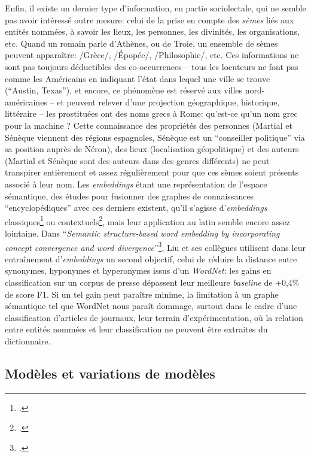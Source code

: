 Enfin, il existe un dernier type d'information, en partie sociolectale, qui ne semble pas avoir intéressé outre mesure: celui de la prise en compte des \textit{sèmes} liés aux entités nommées, à savoir les lieux, les personnes, les divinités, les organisations, etc. Quand un romain parle d'Athènes, ou de Troie, un ensemble de sèmes peuvent apparaître: /Grèce/, /Épopée/, /Philosophie/, etc. Ces informations ne sont pas toujours déductibles des co-occurrences -- tous les locuteurs ne font pas comme les Américains en indiquant l'état dans lequel une ville se trouve (\enquote{Austin, Texas}), et encore, ce phénomène est réservé aux villes nord-américaines -- et peuvent relever d'une projection géographique, historique, littéraire -- les prostituées ont des noms grecs à Rome: qu'est-ce qu'un nom grec pour la machine ? Cette connaissance des propriétés des personnes (Martial et Sénèque viennent des régions espagnoles, Sénèque est un \enquote{conseiller politique} via sa position auprès de Néron), des lieux (localisation géopolitique) et des auteurs (Martial et Sénèque sont des auteurs dans des genres différents) ne peut transpirer entièrement et assez régulièrement pour que ces sèmes soient présents associé à leur nom. Les \textit{embeddings} étant une représentation de l'espace sémantique, des études pour fusionner des graphes de connaissances \enquote{encyclopédiques} avec ces derniers existent, qu'il s'agisse d'\textit{embeddings} classiques\footcite{wang_knowledge_2014} ou contextuels\footcite{zhang_ernie_2019}, mais leur application au latin semble encore assez lointaine. Dans \enquote{\textit{Semantic structure-based word embedding by incorporating concept convergence and word divergence}}\footcite{liu_semantic_2018}, Liu et ses collègues utilisent dans leur entraînement d'\textit{embeddings} un second objectif, celui de réduire la distance entre synonymes, hyponymes et hyperonymes issus d'un \textit{WordNet}: les gains en classification sur un corpus de presse dépassent leur meilleure \textit{baseline} de +0,4\% de score F1. Si un tel gain peut paraître minime, la limitation à un graphe sémantique tel que WordNet nous paraît dommage, surtout dans le cadre d'une classification d'articles de journaux, leur terrain d'expérimentation, où la relation entre entités nommées et leur classification ne peuvent être extraites du dictionnaire.


\subsection{Modèles et variations de modèles}

